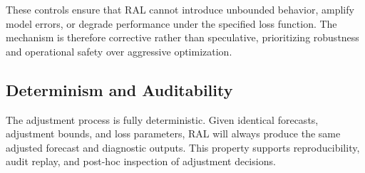 These controls ensure that RAL cannot introduce unbounded behavior, amplify model
errors, or degrade performance under the specified loss function. The mechanism
is therefore corrective rather than speculative, prioritizing robustness and
operational safety over aggressive optimization.

\subsection{Determinism and Auditability}

The adjustment process is fully deterministic. Given identical forecasts,
adjustment bounds, and loss parameters, RAL will always produce the same adjusted
forecast and diagnostic outputs. This property supports reproducibility, audit
replay, and post-hoc inspection of adjustment decisions.
